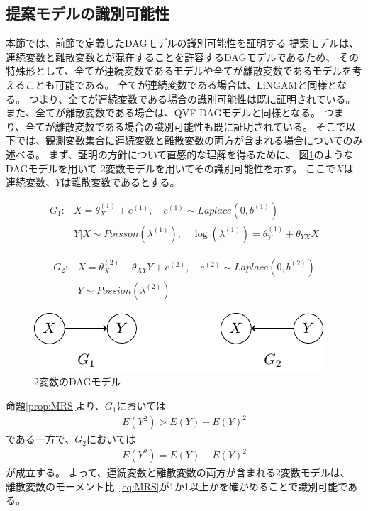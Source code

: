 
\subsection{提案モデルの識別可能性}

本節では、前節で定義したDAGモデルの識別可能性を証明する
提案モデルは、連続変数と離散変数とが混在することを許容するDAGモデルであるため、
その特殊形として、全てが連続変数であるモデルや全てが離散変数であるモデルを考えることも可能である。
全てが連続変数である場合は、LiNGAM\cite{Shimizu2006-yu}と同様となる。
つまり、全てが連続変数である場合の識別可能性は既に証明されている\cite{Shimizu2006-yu}。
また、全てが離散変数である場合は、QVF-DAGモデル\cite{Park2017-hw}と同様となる。
つまり、全てが離散変数である場合の識別可能性も既に証明されている\cite{Park2017-hw}。
そこで以下では、観測変数集合に連続変数と離散変数の両方が含まれる場合についてのみ述べる。
まず、証明の方針について直感的な理解を得るために、
図\ref{fig:ex_prop_bivariate}のようなDAGモデルを用いて
2変数モデルを用いてその識別可能性を示す。
ここで$X$は連続変数、$Y$は離散変数であるとする。

\begin{align*}
  G_1 \colon & X = \theta_{X}^{(1)} + e^{(1)}, \quad e^{(1)} \sim \mathit{Laplace}(0, b^{(1)}) \\
             & Y|X \sim \mathit{Poisson}(\lambda^{(1)}), \quad \log(\lambda^{(1)}) = \theta_Y^{(1)} + \theta_{YX}X
\end{align*}

\begin{align*}
  G_2 \colon & X = \theta_{X}^{(2)} + \theta_{XY}Y + e^{(2)}, \quad e^{(2)} \sim \mathit{Laplace}(0, b^{(2)}) \\
             & Y \sim \mathit{Possion}(\lambda^{(2)})
\end{align*}

\begin{figure}[ht]
  \centering
  \includegraphics{./picture/prop_bivariate.pdf}
  \caption{2変数のDAGモデル}
  \label{fig:ex_prop_bivariate}
\end{figure}

命題\ref{prop:MRS}より、$G_1$においては
\begin{align*}
  E(Y^2) > E(Y) + E(Y)^2
\end{align*}
である一方で、$G_2$においては
\begin{align*}
  E(Y^2) = E(Y) + E(Y)^2
\end{align*}
が成立する。
よって、連続変数と離散変数の両方が含まれる2変数モデルは、
離散変数のモーメント比~\eqref{eq:MRS}が1か1以上かを確かめることで識別可能である。

